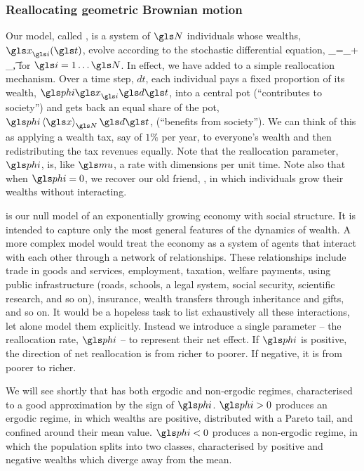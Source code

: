 \subsubsection{Reallocating geometric Brownian motion}
Our model, called \RGBM, is a system of $\N$ individuals whose wealths, $\x_\gi(\t)$, evolve according to the stochastic differential equation,
\be
\gd\x_\gi=\x_\gi \left[(\gmu-\gphi)\gd\t+\gsigma \gd\gW_\gi\left(\t\right)\right]+ \gphi\ave{\x}_\N\gd\t,
\ee
for $\gi=1\dots \N$. In effect, we have added to \GBM a simple reallocation mechanism. Over a time step, $dt$, each individual pays a fixed proportion of its wealth, $\gphi \x_\gi \gd\t$, into a central pot (``contributes to society'') and gets back an equal share of the pot, $\gphi\ave{\x}_\N \gd\t$, (``benefits from society''). We can think of this as applying a wealth tax, say of $1\%$ per year, to everyone's wealth and then redistributing the tax revenues equally. Note that the reallocation parameter, $\gphi$, is, like $\gmu$, a rate with dimensions per unit time. Note also that when $\gphi=0$, we recover our old friend, \GBM, in which individuals grow their wealths without interacting.

\RGBM is our null model of an exponentially growing economy with social structure. It is intended to capture only the most general features of the dynamics of wealth. A more complex model would treat the economy as a system of agents that interact with each other through a network of relationships. These relationships include trade in goods and services, employment, taxation, welfare payments, using public infrastructure (roads, schools, a legal system, social security, scientific research, and so on), insurance, wealth transfers through inheritance and gifts, and so on. It would be a hopeless task to list exhaustively all these interactions, let alone model them explicitly. Instead we introduce a single parameter -- the reallocation rate, $\gphi$ -- to represent their net effect. If $\gphi$ is positive, the direction of net reallocation is from richer to poorer. If negative, it is from poorer to richer.

We will see shortly that \RGBM has both ergodic and non-ergodic regimes, characterised to a good approximation by the sign of $\gphi$. $\gphi>0$ produces an ergodic regime, in which wealths are positive, distributed with a Pareto tail, and confined around their mean value. $\gphi<0$ produces a non-ergodic regime, in which the population splits into two classes, characterised by positive and negative wealths which diverge away from the mean.

